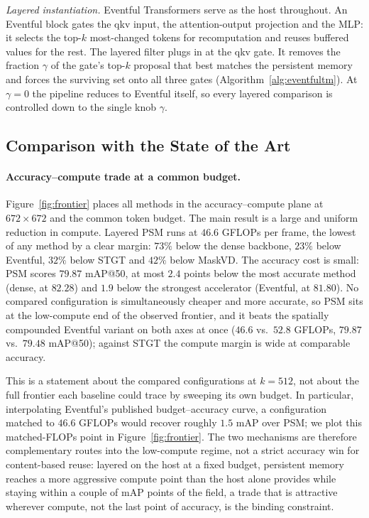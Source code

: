 \emph{Layered instantiation.} Eventful Transformers \cite{eventful}
serve as the host throughout. An Eventful block gates the qkv input, the
attention-output projection and the MLP: it selects the top-$k$
most-changed tokens for recomputation and reuses buffered values for the
rest. The layered filter plugs in at the qkv gate. It removes the
fraction $\gamma$ of the gate's top-$k$ proposal that best matches the
persistent memory and forces the surviving set onto all three gates
(Algorithm~\ref{alg:eventfultm}). At $\gamma = 0$ the pipeline reduces
to Eventful itself, so every layered comparison is controlled down to
the single knob $\gamma$.

\subsection{Comparison with the State of the Art}
\label{sec:eval-sota}

\paragraph{Accuracy--compute trade at a common budget.}
Figure~\ref{fig:frontier} places all methods in the accuracy--compute
plane at $672 \times 672$ and the common token budget. The main result is a large and uniform
reduction in compute. Layered PSM runs at $46.6$ GFLOPs per frame, the
lowest of any method by a clear margin: $73\%$ below the dense backbone,
$23\%$ below Eventful, $32\%$ below STGT and $42\%$ below MaskVD. The
accuracy cost is small: PSM scores $79.87$ mAP@50, at most $2.4$ points
below the most accurate method (dense, at $82.28$) and $1.9$ below the
strongest accelerator (Eventful, at $81.80$). No compared configuration
is simultaneously cheaper and more accurate, so PSM sits at the
low-compute end of the observed frontier, and it beats the spatially
compounded Eventful variant on both axes at once ($46.6$ vs.\ $52.8$
GFLOPs, $79.87$ vs.\ $79.48$ mAP@50); against STGT the compute margin is
wide at comparable accuracy.

This is a statement about the compared configurations at $k = 512$, not
about the full frontier each baseline could trace by sweeping its own
budget. In particular, interpolating Eventful's published
budget--accuracy curve, a configuration matched to $46.6$ GFLOPs would
recover roughly $1.5$ mAP over PSM; we plot this matched-FLOPs point in
Figure~\ref{fig:frontier}. The two
mechanisms are therefore complementary routes into the low-compute
regime, not a strict accuracy win for content-based reuse: layered on
the host at a fixed budget, persistent memory reaches a more aggressive
compute point than the host alone provides while staying within a couple
of mAP points of the field, a trade that is attractive wherever compute,
not the last point of accuracy, is the binding constraint.


